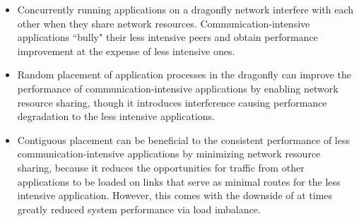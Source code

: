 


\begin{itemize}
   
    \item Concurrently running applications on a dragonfly network interfere with each other when they share network resources. Communication-intensive applications ``bully" their less intensive peers and obtain performance improvement at the expense of less intensive ones. 
    
    \item Random placement of application processes in the dragonfly can improve the performance of communication-intensive applications by enabling network resource sharing, though it introduces interference causing performance degradation to the less intensive applications.
    
   \item Contiguous placement can be beneficial to the consistent performance of less communication-intensive applications by minimizing network resource sharing, because it reduces the opportunities for traffic from other applications to be loaded on links that serve as minimal routes for the less intensive application. However, this comes with the downside of at times greatly reduced system performance via load imbalance.
    
    
\end{itemize}

